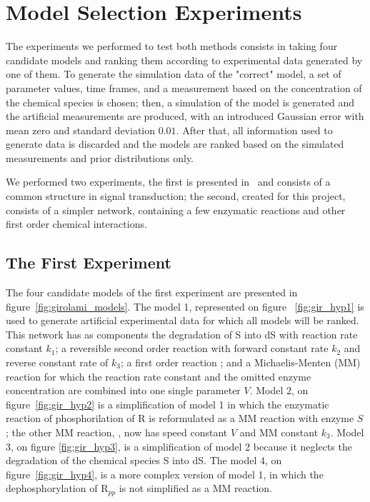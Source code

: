 \section{Model Selection Experiments}
The experiments we performed to test both methods consists in taking 
four candidate models and ranking them according to experimental data 
generated by one of them. To generate the simulation data of the 
"correct" model, a set of parameter values, time frames, and a 
measurement based on the concentration of the chemical species is 
chosen; then, a simulation of the model is generated and the artificial 
measurements are produced, with an introduced Gaussian error with mean
zero and standard deviation $0.01$. After that, all information used to
generate data is discarded and the models are ranked based on the 
simulated measurements and prior distributions only.

We performed two experiments, the first is presented 
in~\cite{Vyshemirsky2007} and consists of a common structure in signal 
transduction; the second, created for this project, consists of a 
simpler network, containing a few enzymatic reactions and other first 
order chemical interactions.

\subsection{The First Experiment}
The four candidate models of the first experiment are presented in 
figure~\ref{fig:girolami_models}. The model 1, represented on figure
~\ref{fig:gir_hyp1} is used to generate artificial experimental data
for which all models will be ranked. This network has as components the
degradation of S into dS with reaction rate constant $k_1$; a reversible 
second order reaction  with forward constant rate $k_2$ 
and reverse constant rate of $k_3$; a first order reaction 
; and a Michaelis-Menten (MM) reaction  
for which the reaction rate constant and the omitted enzyme 
concentration are combined into one single parameter $V$. Model 2, on 
figure~\ref{fig:gir_hyp2} is a simplification of model 1 in which the
enzymatic reaction of phosphorilation of R is reformulated as a 
MM reaction with enzyme $S$; the other MM reaction, , 
now has speed constant $V$ and MM constant $k_3$. Model 3, on figure
\ref{fig:gir_hyp3}, is a simplification of model 2 because it neglects 
the degradation of the chemical species S into dS. The model 4, on 
figure~\ref{fig:gir_hyp4}, is a more complex version of model 1, in 
which the dephosphorylation of R$_{pp}$ is not simplified as a MM 
reaction.

